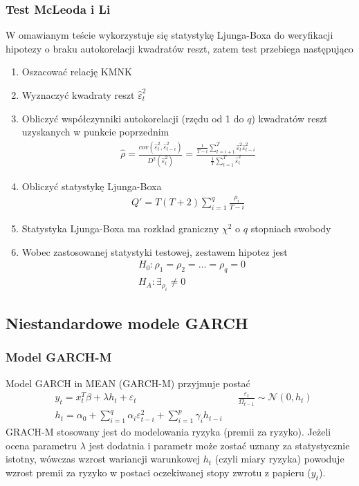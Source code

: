 \subsubsection{Test McLeoda i Li}
W omawianym teście wykorzystuje się statystykę Ljunga-Boxa do weryfikacji hipotezy o braku autokorelacji kwadratów reszt, zatem test przebiega następująco
\begin{enumerate}
\item Oszacować relację KMNK
\item Wyznaczyć kwadraty reszt $ \hat\varepsilon_t^2 $
\item Obliczyć współczynniki autokorelacji (rzędu od 1 do $ q $) kwadratów reszt uzyskanych w punkcie poprzednim
\begin{gather*}
\hat{\rho}=\frac{cov\left(\hat \varepsilon_t^2,\hat \varepsilon_{t-i}^2\right)}{D^2\left(\hat \varepsilon_t^2\right)}
=
\frac{\frac{1}{T-i}\sum_{t=i+1}^{T}\hat \varepsilon_t^2\hat \varepsilon_{t-i}^2}{\frac{1}{T}\sum_{t=1}^{T}\hat \varepsilon_t^2}
\end{gather*}
\item Obliczyć statystykę Ljunga-Boxa
\begin{gather*}
Q'=T(T+2)\sum_{i=1}^{q}\frac{\rho_i}{T-i}
\end{gather*}
\item Statystyka Ljunga-Boxa ma rozkład graniczny $ \chi^2 $ o $ q $ stopniach swobody
\item Wobec zastosowanej statystyki testowej, zestawem hipotez jest
\begin{align*}
&H_0:\rho_1=\rho_2=\dots=\rho_q=0\\
&H_A:\exists_{\rho_i}\neq 0
\end{align*}
\end{enumerate}
\subsection{Niestandardowe modele GARCH}
\subsubsection{Model GARCH-M}
Model GARCH in MEAN (GARCH-M) przyjmuje postać
\begin{align*}
&y_t=x_t^T\beta +\lambda h_t+\varepsilon_t &&\frac{\varepsilon_t}{\Omega_{t-1}}\sim\mathcal N(0,h_t)\\
&h_t=\alpha_0+\sum_{i=1}^{q}\alpha_i\varepsilon_{t-i}^2+\sum_{i=1}^{p}\gamma_ih_{t-i}
\end{align*}
GRACH-M stosowany jest do modelowania ryzyka (premii za ryzyko). Jeżeli ocena parametru $ \lambda $ jest dodatnia i parametr może zostać uznany za statystycznie istotny, wówczas wzrost wariancji warunkowej $ h_t $ (czyli miary ryzyka) powoduje wzrost premii za ryzyko w postaci oczekiwanej stopy zwrotu z papieru ($ y_t $).
